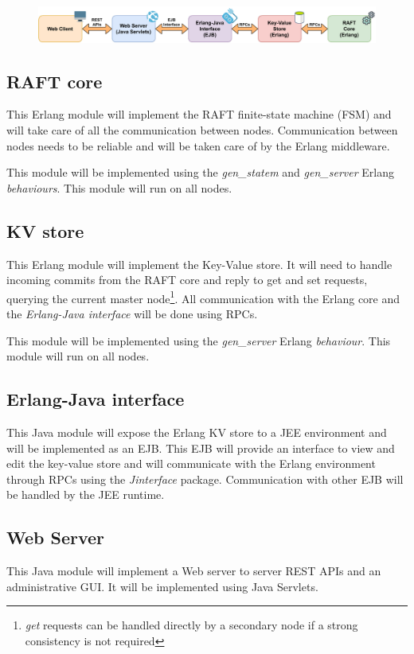 \documentclass[a4paper]{article}
\begin{document}
    \begin{figure}[h]
        \includegraphics[width=\textwidth]{raft_architecture.pdf}
    \end{figure}

    \subsection{RAFT core}
    \label{sec:raft-core}

    This Erlang module will implement the RAFT finite-state machine (FSM)
    and will take care of all the communication between nodes. Communication
    between nodes needs to be reliable and will be taken care of by the Erlang
    middleware. 

    This module will be implemented using the \emph{gen\_statem} and 
    \emph{gen\_server} Erlang \emph{behaviours}. This module will run on all 
    nodes.

    \subsection{KV store}
    \label{sec:kv-store}

    This Erlang module will implement the Key-Value store. It will need to 
    handle incoming commits from the RAFT core and reply to get and set 
    requests, querying the current master node\footnote{\emph{get} requests can 
    be handled directly by a secondary node if a strong consistency is not 
    required}. All communication with the Erlang core and the \emph{Erlang-Java
    interface} will be done using RPCs.

    This module will be implemented using the \emph{gen\_server} Erlang 
    \emph{behaviour}.
    This module will run on all nodes.

    \subsection{Erlang-Java interface}
    \label{sec:erlang-java}

    This Java module will expose the Erlang KV store to a JEE environment and 
    will be implemented as an EJB. This EJB will provide an interface to 
    view and edit the key-value store and will communicate with the Erlang 
    environment through RPCs using the \emph{Jinterface} package. Communication
    with other EJB will be handled by the JEE runtime.

    \subsection{Web Server}
    \label{sec:web-server}
    This Java module will implement a Web server to server REST APIs and an 
    administrative GUI. It will be implemented using Java Servlets.
\end{document}
